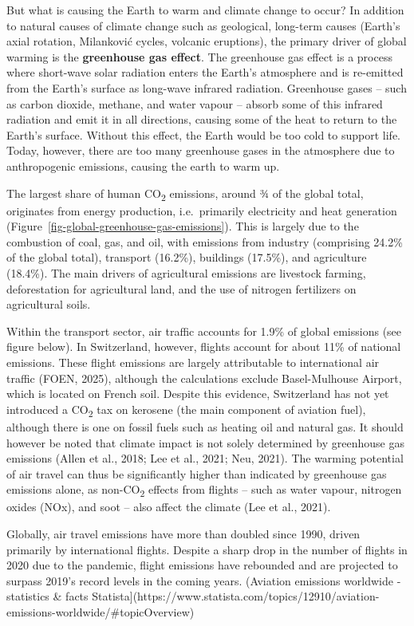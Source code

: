 \documentclass[
  a4paper,
  openany]{book}
\begin{document}
But what is causing the Earth to warm and climate change to occur? In
addition to natural causes of climate change such as geological,
long-term causes (Earth's axial rotation, Milanković cycles, volcanic
eruptions), the primary driver of global warming is the
\textbf{greenhouse gas effect}. The greenhouse gas effect is a process
where short-wave solar radiation enters the Earth's atmosphere and is
re-emitted from the Earth's surface as long-wave infrared radiation.
Greenhouse gases -- such as carbon dioxide, methane, and water vapour --
absorb some of this infrared radiation and emit it in all directions,
causing some of the heat to return to the Earth's surface. Without this
effect, the Earth would be too cold to support life. Today, however,
there are too many greenhouse gases in the atmosphere due to
anthropogenic emissions, causing the earth to warm up.

The largest share of human CO\textsubscript{2} emissions, around ¾ of
the global total, originates from energy production, i.e.~primarily
electricity and heat generation
(Figure~\ref{fig-global-greenhouse-gas-emissions}). This is largely due
to the combustion of coal, gas, and oil, with emissions from industry
(comprising 24.2\% of the global total), transport (16.2\%), buildings
(17.5\%), and agriculture (18.4\%). The main drivers of agricultural
emissions are livestock farming, deforestation for agricultural land,
and the use of nitrogen fertilizers on agricultural soils.

Within the transport sector, air traffic accounts for 1.9\% of global
emissions (see figure below). In Switzerland, however, flights account
for about 11\% of national emissions. These flight emissions are largely
attributable to international air traffic (FOEN, 2025), although the
calculations exclude Basel-Mulhouse Airport, which is located on French
soil. Despite this evidence, Switzerland has not yet introduced a
CO\textsubscript{2} tax on kerosene (the main component of aviation
fuel), although there is one on fossil fuels such as heating oil and
natural gas. It should however be noted that climate impact is not
solely determined by greenhouse gas emissions (Allen et al., 2018; Lee
et al., 2021; Neu, 2021). The warming potential of air travel can thus
be significantly higher than indicated by greenhouse gas emissions
alone, as non-CO\textsubscript{2} effects from flights -- such as water
vapour, nitrogen oxides (NOx), and soot -- also affect the climate (Lee
et al., 2021).

Globally, air travel emissions have more than doubled since 1990, driven
primarily by international flights. Despite a sharp drop in the number
of flights in 2020 due to the pandemic, flight emissions have rebounded
and are projected to surpass 2019's record levels in the coming years.
(Aviation emissions worldwide - statistics \& facts \textbar{}
Statista{]}(https://www.statista.com/topics/12910/aviation-emissions-worldwide/\#topicOverview)
\end{document}

